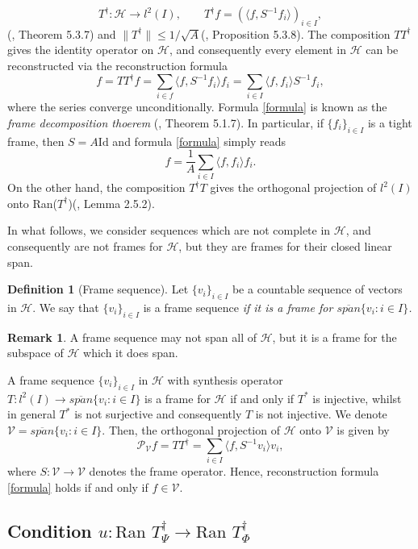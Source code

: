\documentclass[reqno,10pt]{amsart}
\theoremstyle{plain}
\theoremstyle{definition}
\newtheorem{defn}{Definition}
\newtheorem{rem}{Remark}
\newcommand{\cal}[1]{\mathcal{#1}}
\begin{document}
    $$ T^\dag : \cal H \to l^2(I), \qquad T^\dag f = (\langle f, S^{-1}f_i\rangle)_{i\in I},$$
    (\cite{Christensen2008-gk}, Theorem 5.3.7) and $\|T^\dag\| \leq 1/\sqrt{A}$(\cite{Christensen2008-gk}, Proposition 5.3.8). The composition $TT^\dag$ gives the identity operator on $\cal H$, and consequently every element in $\cal H$ can be reconstructed via the reconstruction formula
    \begin{equation}\label{formula}
        f = TT^\dag f= \sum_{i\in f}\langle f,S^{-1}f_i\rangle f_i = \sum_{i\in I}\langle f,f_i\rangle S^{-1}f_i,
    \end{equation}
    where the series converge unconditionally. Formula \ref{formula} is known as the {\it frame decomposition thoerem} (\cite{Christensen2008-gk}, Theorem 5.1.7). In particular, if $\{f_i\}_{i\in I}$ is a tight frame, then $S = A\text{Id}$ and formula \ref{formula} simply reads
    $$ f = \frac{1}{A}\sum_{i\in I}\langle f,f_i\rangle f_i.$$
    On the other hand, the composition $T^\dag T$ gives the orthogonal projection of $l^2(I)$ onto Ran($T^\dag$)(\cite{Christensen2008-gk}, Lemma 2.5.2).

    \noindent In what follows, we consider sequences which are not complete in $\cal H$, and consequently are not frames for $\cal H$, but they are frames for their closed linear span.
    \begin{defn}[Frame sequence]
        Let $\{v_i\}_{i\in I}$ be a countable sequence of vectors in $\cal H$. We say that $\{v_i\}_{i\in I}$ is a frame sequence {\it if it is a frame for $\overline{span}\{v_i:i\in I\}$.}
    \end{defn}
    \begin{rem}
        A frame sequence may not span all of $\cal H$, but it is a frame for the subspace of $\cal H$ which it does span.
    \end{rem}
    \noindent A frame sequence $\{v_i\}_{i\in I}$ in $\cal H$ with synthesis operator $T : l^2(I) \to \overline{span}\{v_i : i\in I\}$ is a frame for $\cal H$ if and only if $T^*$ is injective, whilst in general $T^*$ is not surjective and consequently $T$ is not injective. We denote $\cal V = \overline{span}\{v_i : i\in I\}$. Then, the orthogonal projection of $\cal H$ onto $\cal V$ is given by
    $$ \cal P_{\cal V}f = TT^\dag = \sum_{i\in I}\langle f,S^{-1}v_i\rangle v_i,$$
    where $S : \cal V \to \cal V$ denotes the frame operator. Hence, reconstruction formula \ref{formula} holds if and only if $f\in \cal V$.
    \subsection{\texorpdfstring{Condition $u:\text{Ran }T^\dag_\Psi \to \text{Ran }T^\dag_\Phi$}{}} \label{appendix:B.1}
\end{document}
